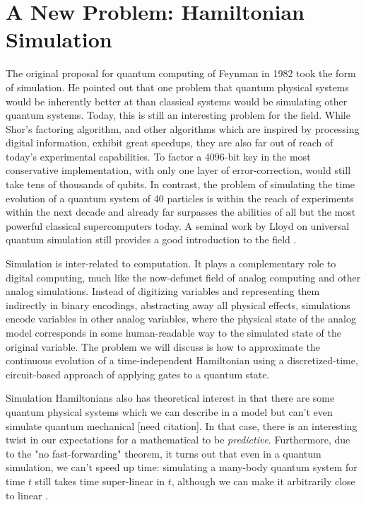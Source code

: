 \section{A New Problem: Hamiltonian Simulation}
\label{sec:cohere-hs-bg}

The original proposal for quantum computing of Feynman in 1982 \cite{Feynman1982}
took the form of simulation. He pointed out that one problem that
quantum physical systems would be inherently better at than classical systems
would be simulating other quantum systems. Today, this is still an interesting
problem for the field. While Shor's factoring algorithm, and other algorithms
which are inspired by processing digital information, exhibit great speedups,
they are also far out of reach of today's experimental capabilities. To
factor a 4096-bit key in the most conservative implementation, with only
one layer of error-correction, would still take tens of thousands of qubits.
In contrast, the problem of simulating the time evolution of a quantum system of 40 particles
is within the reach of experiments within the next decade and already
far surpasses the abilities of all but the most powerful classical supercomputers
today. A seminal work by Lloyd on universal quantum simulation still provides a
good introduction to the field \cite{Lloyd1996}.

Simulation is inter-related to computation. It
plays a complementary role to digital computing, much like the
now-defunct field of analog computing and other analog simulations. Instead
of digitizing variables and representing them indirectly in binary
encodings, abstracting away all physical effects, simulations encode variables
in other analog variables, where the physical state of the analog model
corresponds in some human-readable way to the simulated state of the
original variable. The problem we will discuss is how to approximate
the continuous evolution of a time-independent Hamiltonian using
a discretized-time, circuit-based approach of applying gates to a quantum
state.

Simulation Hamiltonians also has theoretical interest in that there are some
quantum physical systems which we can describe in a model
but can't even simulate quantum mechanical [need citation]. In that case,
there is an interesting twist in our expectations for a mathematical
to be \emph{predictive}. Furthermore, due to the "no fast-forwarding" theorem,
it turns out that even in a quantum simulation, we can't speed up time:
simulating a many-body quantum system for time $t$ still takes time
super-linear in $t$, although we can make it arbitrarily close to
linear \cite{Berry2005}.

